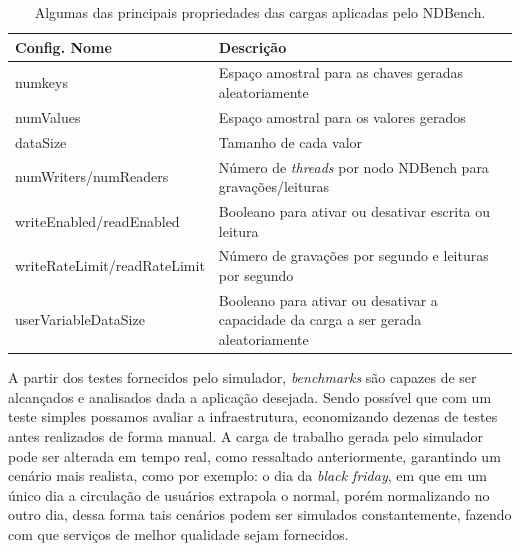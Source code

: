\documentclass[12pt,english,brazil]{article}
\begin{document}
\begin{table}[!ht]
\label{table:1}
\caption{Algumas das principais propriedades das cargas aplicadas pelo NDBench.}
\begin{adjustbox}{scale=0.815}  
\begin{tabular}{ll}
Config. Nome                                      & Descrição                                                                           \\ \hline
\multicolumn{1}{l|}{numkeys}                      & Espaço amostral para as chaves geradas aleatoriamente                               \\
\multicolumn{1}{l|}{numValues}                    & Espaço amostral para os valores gerados                                             \\
\multicolumn{1}{l|}{dataSize}                     & Tamanho de cada valor                                                               \\
\multicolumn{1}{l|}{numWriters/numReaders}        & Número de \textit{threads} por nodo NDBench para gravações/leituras                          \\
\multicolumn{1}{l|}{writeEnabled/readEnabled}     & Booleano para ativar ou desativar escrita ou leitura                                \\
\multicolumn{1}{l|}{writeRateLimit/readRateLimit} & Número de gravações por segundo e leituras por segundo                              \\
\multicolumn{1}{l|}{userVariableDataSize}         & Booleano para ativar ou desativar a capacidade da carga a ser gerada aleatoriamente \\ \hline
\end{tabular}
\end{adjustbox}
\end{table}

A partir dos testes fornecidos pelo simulador, \textit{benchmarks} são capazes de ser alcançados e analisados dada a aplicação desejada. Sendo possível que com um teste simples possamos avaliar a infraestrutura, economizando dezenas de testes antes realizados de forma manual. A carga de trabalho gerada pelo simulador pode ser alterada em tempo real, como ressaltado anteriormente, garantindo um cenário mais realista, como por exemplo: o dia da \textit{black friday}, em que em um único dia a circulação de usuários extrapola o normal, porém normalizando no outro dia, dessa forma tais cenários podem ser simulados constantemente, fazendo com que serviços de melhor qualidade sejam fornecidos.
\end{document}
